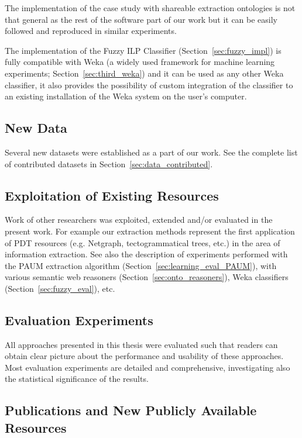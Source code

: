 The implementation of the case study with shareable extraction ontologies is not that general as the rest of the software part of our work but it can be easily followed and reproduced in similar experiments.

The implementation of the Fuzzy ILP Classifier (Section~\ref{sec:fuzzy_impl}) is fully compatible with Weka (a widely used framework for machine learning experiments; Section~\ref{sec:third_weka}) and it can be used as any other Weka classifier, it also provides the possibility of custom integration of the classifier to an existing installation of the Weka system on the user's computer.

\subsection{New Data}

Several new datasets were established as a part of our work. See the complete list of contributed datasets in Section~\ref{sec:data_contributed}.

\subsection{Exploitation of Existing Resources}

Work of other researchers was exploited, extended and/or evaluated in the present work. For example our extraction methods represent the first application of PDT resources (e.g. Netgraph, tectogrammatical trees, etc.) in the area of information extraction. See also the description of experiments performed with the PAUM extraction algorithm (Section~\ref{sec:learning_eval_PAUM}), with various semantic web reasoners (Section~\ref{sec:onto_reasoners}), Weka classifiers (Section~\ref{sec:fuzzy_eval}), etc.

\subsection{Evaluation Experiments}

All approaches presented in this thesis were evaluated such that readers can obtain clear picture about the performance and usability of these approaches. Most evaluation experiments are detailed and comprehensive, investigating also the statistical significance of the results.

\subsection{Publications and New Publicly Available Resources}

